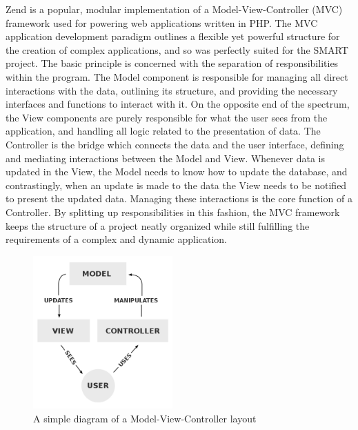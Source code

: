 \documentclass[12pt]{article}
\begin{document}
Zend is a popular, modular implementation of a Model-View-Controller (MVC) framework used for powering web applications written in PHP. The MVC application development paradigm outlines a flexible yet powerful structure for the creation of complex applications, and so was perfectly suited for the SMART project. The basic principle is concerned with the separation of responsibilities within the program. The Model component is responsible for managing all direct interactions with the data, outlining its structure, and providing the necessary interfaces and functions to interact with it. On the opposite end of the spectrum, the View components are purely responsible for what the user sees from the application, and handling all logic related to the presentation of data. The Controller is the bridge which connects the data and the user interface, defining and mediating interactions between the Model and View. Whenever data is updated in the View, the Model needs to know how to update the database, and contrastingly, when an update is made to the data the View needs to be notified to present the updated data. Managing these interactions is the core function of a Controller. By splitting up responsibilities in this fashion, the MVC framework keeps the structure of a project neatly organized while still fulfilling the requirements of a complex and dynamic application.

\begin{figure}[h]
    \begin{center}
        \centerline{\includegraphics[width=2.1in]{diagrams/MVC.png}}
    \end{center}
    \vspace{-20pt}
    \begin{spacing}{1.0}\caption{A simple diagram of a Model-View-Controller layout\protect\footnotemark}\end{spacing}
\end{figure}

\end{document}
